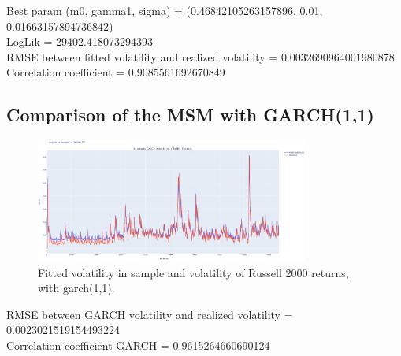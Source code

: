 \FloatBarrier

Best param (m0, gamma1, sigma) = (0.46842105263157896, 0.01, 0.01663157894736842) \\

LogLik = 29402.418073294393 \\

RMSE between fitted volatility and realized volatility = 0.0032690964001980878 \\

Correlation coefficient = 0.9085561692670849 \\



\subsection{Comparison of the MSM with GARCH(1,1)}

\begin{figure}[!ht]
    \centering
    \includegraphics[width=0.8\textwidth]{img/garch_vol}
    \caption{Fitted volatility in sample and volatility of Russell  2000 returns, with garch(1,1).}
    \label{fig:garch_fitted_vol}
\end{figure}

\FloatBarrier

RMSE between GARCH volatility and realized volatility = 0.0023021519154493224 \\

Correlation coefficient GARCH = 0.9615264660690124 \\
